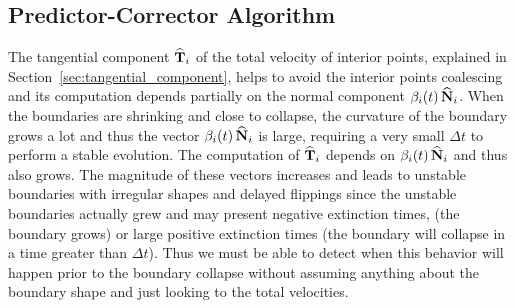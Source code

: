 \subsection{Predictor-Corrector Algorithm}

The tangential component $\widehat{\mathbf{T}}_i$ of the total velocity of interior points, explained in Section~\ref{sec:tangential_component}, helps to avoid the interior points coalescing and its computation depends partially on the normal component $\displaystyle \beta_i(t)\,\widehat{\mathbf{N}}_i$. 
When the boundaries are shrinking and close to collapse, the curvature of the boundary grows a lot and thus the vector $\beta_i(t)\,\widehat{\mathbf{N}}_i$ is large, requiring a very small $\Delta t$ to perform a stable evolution. 
The computation of $\widehat{\mathbf{T}}_i$ depends on $\beta_i(t)\,\widehat{\mathbf{N}}_i$ and thus also grows. %
The magnitude of these vectors increases and leads to unstable boundaries with irregular shapes and delayed flippings since the unstable boundaries actually grew and may present negative extinction times, (\ie the boundary grows) or large positive extinction times (the boundary will collapse in a time greater than $\Delta t$). 
Thus we must be able to detect when this behavior will happen prior to the boundary collapse without assuming anything about the boundary shape and just looking to the total velocities.
%
